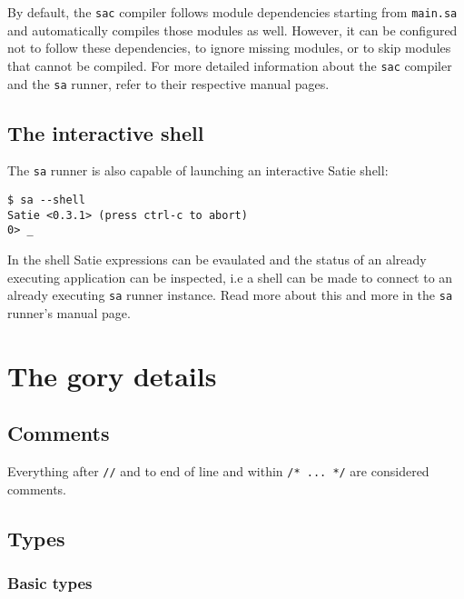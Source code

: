 By default, the \texttt{sac} compiler follows module dependencies
starting from \texttt{main.sa} and automatically compiles those modules
as well. However, it can be configured not to follow these dependencies,
to ignore missing modules, or to skip modules that cannot be compiled.
For more detailed information about the \texttt{sac} compiler and the
\texttt{sa} runner, refer to their respective manual pages.

\hypertarget{the-interactive-shell}{%
\subsection{The interactive shell}\label{the-interactive-shell}}

The \texttt{sa} runner is also capable of launching an interactive Satie
shell:

\begin{verbatim}
$ sa --shell
Satie <0.3.1> (press ctrl-c to abort)
0> _
\end{verbatim}

In the shell Satie expressions can be evaulated and the status of an
already executing application can be inspected, i.e a shell can be made
to connect to an already executing \texttt{sa} runner instance. Read
more about this and more in the \texttt{sa} runner's manual page.

\hypertarget{the-gory-details}{%
\section{The gory details}\label{the-gory-details}}

\hypertarget{comments}{%
\subsection{Comments}\label{comments}}

Everything after \texttt{//} and to end of line and within
\texttt{/*\ ...\ */} are considered comments.

\hypertarget{types}{%
\subsection{Types}\label{types}}

\hypertarget{basic-types}{%
\subsubsection{Basic types}\label{basic-types}}

